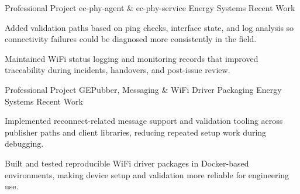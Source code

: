 

\begin{cventries}

  \cventry
    {Professional Project} %
    {ec-phy-agent \& ec-phy-service} %
    {Energy Systems} %
    {Recent Work} %
    {
      \begin{cvitems} %
        \item {Added validation paths based on ping checks, interface state, and log analysis so connectivity failures could be diagnosed more consistently in the field.}
        \item {Maintained WiFi status logging and monitoring records that improved traceability during incidents, handovers, and post-issue review.}
      \end{cvitems}
    }

  \cventry
    {Professional Project} %
    {GEPubber, Messaging \& WiFi Driver Packaging} %
    {Energy Systems} %
    {Recent Work} %
    {
      \begin{cvitems} %
        \item {Implemented reconnect-related message support and validation tooling across publisher paths and client libraries, reducing repeated setup work during debugging.}
        \item {Built and tested reproducible WiFi driver packages in Docker-based environments, making device setup and validation more reliable for engineering use.}
      \end{cvitems}
    }

\end{cventries}
